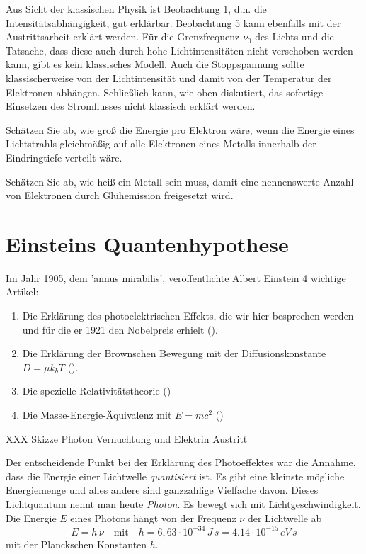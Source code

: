 Aus Sicht der klassischen Physik ist Beobachtung 1, d.h. die Intensitätsabhängigkeit, gut erklärbar. Beobachtung 5 kann ebenfalls mit der Austrittsarbeit erklärt werden. Für die Grenzfrequenz $\nu_0$ des Lichts und die Tatsache, dass diese auch durch hohe Lichtintensitäten nicht verschoben werden kann, gibt es kein klassisches Modell. Auch die Stoppspannung sollte klassischerweise von der Lichtintensität und damit von der Temperatur der Elektronen abhängen. Schließlich kann, wie oben diskutiert, das sofortige Einsetzen des Stromflusses nicht klassisch erklärt werden.

\begin{questions}
    \item Schätzen Sie ab, wie groß die Energie pro Elektron wäre, wenn die Energie eines Lichtstrahls gleichmäßig auf alle Elektronen eines Metalls innerhalb der Eindringtiefe verteilt wäre.
    \item Schätzen Sie ab,  wie heiß ein Metall sein muss, damit eine nennenswerte Anzahl von Elektronen durch Glühemission freigesetzt wird.
\end{questions}

\section{Einsteins Quantenhypothese}

Im Jahr 1905, dem 'annus mirabilis',  veröffentlichte Albert Einstein 4 wichtige Artikel:
\begin{enumerate}\setlength{\itemsep}{0pt}
    \item Die Erklärung des photoelektrischen Effekts, die wir hier besprechen werden und für die er 1921 den Nobelpreis erhielt (\cite{Einstein05_licht}).
    \item Die Erklärung der Brownschen Bewegung mit der Diffusionskonstante $D = \mu k_b T$ (\cite{Einstein05_waerme}).
    \item Die spezielle Relativitätstheorie (\cite{Einstein05_ED})
    \item Die Masse-Energie-Äquivalenz mit $E = m c^2$ (\cite{Einstein05_energie})
\end{enumerate}

\begin{marginfigure}
    \caption{XXX Skizze Photon Vernuchtung und Elektrin Austritt }
   \end{marginfigure}


Der entscheidende Punkt bei der Erklärung des Photoeffektes war die Annahme, dass die Energie einer Lichtwelle \emph{quantisiert} ist. Es gibt eine kleinste mögliche Energiemenge und alles andere sind ganzzahlige Vielfache davon. Dieses Lichtquantum nennt man heute \emph{Photon}. Es bewegt sich mit Lichtgeschwindigkeit.  Die Energie $E$ eines Photons hängt von der Frequenz $\nu$ der Lichtwelle ab
\begin{equation}
    E = h \, \nu \quad \text{mit} \quad h = 6,63 \cdot 10^{-34} \, J \, s = 4.14 \cdot 10^{-15}\, eV \, s
\end{equation}
mit der Planckschen Konstanten $h$. 

